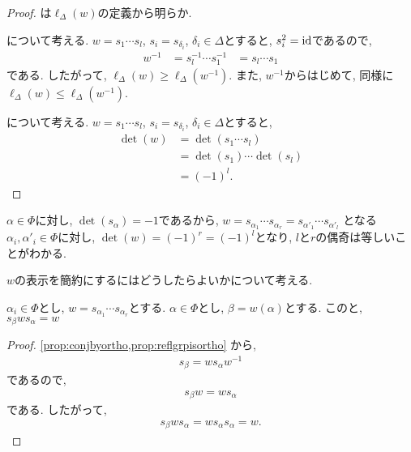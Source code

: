 \begin{proof}
  は$\ell_\Delta(w)$の定義から明らか.

  について考える.
  $w=s_1\cdots s_l$, $s_i=s_{\delta_i}$, $\delta_i\in \Delta$とすると,
  $s_i^2=\operatorname{id}$であるので,
  \begin{align*}
    w^{-1}
    &=s_l^{-1}\cdots s_1^{-1}
    &=s_l\cdots s_1
  \end{align*}
  である. したがって, $\ell_\Delta(w) \geq \ell_\Delta(w^{-1})$.
  また,
  $w^{-1}$からはじめて,
  同様に$\ell_\Delta(w) \leq \ell_\Delta(w^{-1})$.

  について考える.
  $w=s_1\cdots s_l$, $s_i=s_{\delta_i}$, $\delta_i\in \Delta$とすると,
  \begin{align*}
    \det(w)&=\det(s_1\cdots s_{l})\\
    &=\det(s_1)\cdots \det(s_{l})\\
    &=(-1)^{l}.
  \end{align*}
\end{proof}

\begin{remark}
  $\alpha\in\Phi$に対し, $\det(s_\alpha)=-1$であるから,
  $w=s_{\alpha_1}\cdots s_{\alpha_r}=s_{\alpha'_1}\cdots s_{\alpha'_l}$
  となる$\alpha_i, \alpha'_i\in \Phi$に対し,
  $\det(w)=(-1)^r=(-1)^l$となり,
  $l$と$r$の偶奇は等しいことがわかる.
\end{remark}


$w$の表示を簡約にするにはどうしたらよいかについて考える.



\begin{lemma}
  \label{lem:formula:conjdeletion}
  $\alpha_i\in\Phi$とし,
  $w=s_{\alpha_1}\cdots s_{\alpha_r}$とする.
  $\alpha\in\Phi$とし,
  $\beta=w(\alpha)$とする.
  このと, $s_\beta w s_\alpha=w$
\end{lemma}
\begin{proof}
\cref{prop:conjbyortho,prop:reflgrpisortho}
から,
\begin{align*}
  s_\beta=ws_\alpha w^{-1}
\end{align*}
であるので,
\begin{align*}
  s_\beta w=ws_\alpha 
\end{align*}
である.
したがって,
\begin{align*}
  s_\beta w s_\alpha=ws_\alpha s_\alpha= w. 
\end{align*}
\end{proof}

